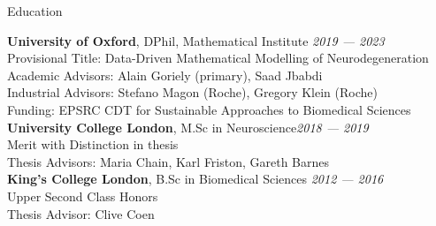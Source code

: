 \begin{rSection}{Education}

{\bf University of Oxford}, DPhil, Mathematical Institute  \hfill {\em 2019 — 2023} \\
Provisional Title: Data-Driven Mathematical Modelling of Neurodegeneration \\
Academic Advisors: Alain Goriely (primary), Saad Jbabdi \\
Industrial Advisors: Stefano Magon (Roche), Gregory Klein (Roche)\\
Funding: EPSRC CDT for Sustainable Approaches to Biomedical Sciences \\

{\bf University College London},  M.Sc in Neuroscience\hfill {\em 2018 — 2019} \\ 
Merit with Distinction in thesis \\
Thesis Advisors: Maria Chain, Karl Friston, Gareth Barnes \\

{\bf King's College London}, B.Sc in Biomedical Sciences \hfill {\em 2012 — 2016} \\ 
Upper Second Class Honors \\
Thesis Advisor: Clive Coen
\end{rSection}


